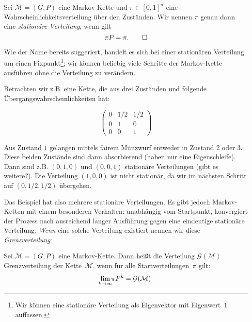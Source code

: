 \begin{definition}\label{def:stationaere-verteilung}
    Sei $\mathcal M = (G, P)$ eine Markov-Kette und $\pi \in [0, 1]^n$ eine Wahrscheinlichkeitsverteilung über den Zuständen.
    Wir nennen $\pi$ genau dann eine \emph{stationäre Verteilung}, wenn gilt
    \begin{equation}
        \pi P = \pi. \qedhere
    \end{equation}
\end{definition}

Wie der Name bereits suggeriert, handelt es sich bei einer stationären Verteilung um einen Fixpunkt\footnote{Wir können eine stationäre Verteilung als Eigenvektor mit Eigenwert~$1$ auffassen.};
wir können beliebig viele Schritte der Markov-Kette ausführen ohne die Verteilung zu verändern.

\begin{example}
    Betrachten wir z.B. eine Kette, die aus drei Zuständen und folgende Übergangswahrscheinlichkeiten hat:

    \begin{equation}
        \begin{pmatrix}
            0 & 1/2 & 1/2 \\
            0 & 1   & 0   \\
            0 & 0   & 1
        \end{pmatrix}
    \end{equation}

    Aus Zustand $1$ gelangen mittels fairem Münzwurf entweder in Zustand 2 oder 3.
    Diese beiden Zustände sind dann absorbierend (haben nur eine Eigenschleife).
    Dann sind z.B. $(0, 1, 0)$ und $(0, 0, 1)$ stationäre Verteilungen (gibt es weitere?).
    Die Verteilung $(1, 0, 0)$ ist nicht stationär, da wir im nächsten Schritt auf $(0, 1/2, 1/2)$ übergehen.
\end{example}

Das Beispiel hat also mehrere stationäre Verteilungen.
Es gibt jedoch Markov-Ketten mit einem besonderen Verhalten:
unabhängig vom Startpunkt, konvergiert der Prozess nach ausreichend langer Ausführung gegen eine eindeutige stationäre Verteilung.
\emph{Wenn} eine solche Verteilung existiert nennen wir diese \emph{Grenzverteilung}:

\def\grenz{\ensuremath{\mathcal G(\mathcal M)}\xspace}

\begin{definition}\label{def:grenzverteilung}
    Sei $\mathcal M = (G, P)$ eine Markov-Kette.
Dann heißt die Verteilung \grenz{} Grenzverteilung der Kette~$\mathcal M$, wenn für alle Startverteilungen~$\pi$ gilt:
\begin{equation}\label{eq:grenzverteilung}
        \smashoperator{\lim_{k \to \infty}} \pi P^k = \mathcal G(\mathcal M)
    \end{equation}
\end{definition}

